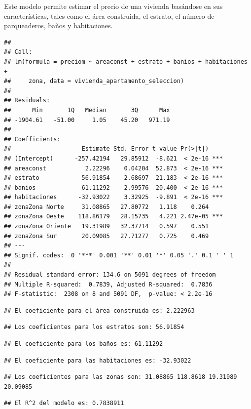\documentclass[
]{article}
\begin{document}
Este modelo permite estimar el precio de una vivienda basándose en sus
características, tales como el área construida, el estrato, el número de
parqueaderos, baños y habitaciones.

\begin{verbatim}
## 
## Call:
## lm(formula = preciom ~ areaconst + estrato + banios + habitaciones + 
##     zona, data = vivienda_apartamento_seleccion)
## 
## Residuals:
##      Min       1Q   Median       3Q      Max 
## -1904.61   -51.00     1.05    45.20   971.19 
## 
## Coefficients:
##                    Estimate Std. Error t value Pr(>|t|)    
## (Intercept)      -257.42194   29.85912  -8.621  < 2e-16 ***
## areaconst           2.22296    0.04204  52.873  < 2e-16 ***
## estrato            56.91854    2.68697  21.183  < 2e-16 ***
## banios             61.11292    2.99576  20.400  < 2e-16 ***
## habitaciones      -32.93022    3.32925  -9.891  < 2e-16 ***
## zonaZona Norte     31.08865   27.80772   1.118    0.264    
## zonaZona Oeste    118.86179   28.15735   4.221 2.47e-05 ***
## zonaZona Oriente   19.31989   32.37714   0.597    0.551    
## zonaZona Sur       20.09085   27.71277   0.725    0.469    
## ---
## Signif. codes:  0 '***' 0.001 '**' 0.01 '*' 0.05 '.' 0.1 ' ' 1
## 
## Residual standard error: 134.6 on 5091 degrees of freedom
## Multiple R-squared:  0.7839, Adjusted R-squared:  0.7836 
## F-statistic:  2308 on 8 and 5091 DF,  p-value: < 2.2e-16
\end{verbatim}

\begin{verbatim}
## El coeficiente para el área construida es: 2.222963
\end{verbatim}

\begin{verbatim}
## Los coeficientes para los estratos son: 56.91854
\end{verbatim}

\begin{verbatim}
## El coeficiente para los baños es: 61.11292
\end{verbatim}

\begin{verbatim}
## El coeficiente para las habitaciones es: -32.93022
\end{verbatim}

\begin{verbatim}
## Los coeficientes para las zonas son: 31.08865 118.8618 19.31989 20.09085
\end{verbatim}

\begin{verbatim}
## El R^2 del modelo es: 0.7838911
\end{verbatim}
\end{document}
